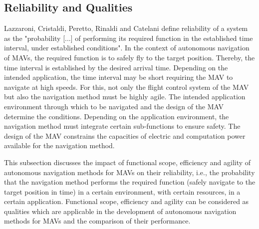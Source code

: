 \subsection{Reliability and Qualities}

Lazzaroni, Cristaldi, Peretto, Rinaldi and Catelani \cite{Lazzaroni2011}
define reliability of a system as the "probability [...] of performing its required function 
in the established time interval, under established conditions".
In the context of autonomous navigation of MAVs,
the required function is to safely fly to the target position.
Thereby, the time interval is established by the desired arrival time.
Depending on the intended application, the time interval may be short requiring the MAV to navigate at high speeds.
For this, not only the flight control system of the MAV but also the navigation method must be highly agile.
The intended application environment through which to be navigated and the design of the MAV determine the conditions.
Depending on the application environment, the navigation method must integrate certain sub-functions to ensure safety.
The design of the MAV constrains the capacities of electric and computation power available for the navigation method.

This subsection discusses the impact of functional scope, efficiency and agility
of autonomous navigation methods for MAVs on their reliability, 
i.e., the probability that the navigation method performs 
the required function (safely navigate to the target position in time)
in a certain environment, with certain resources, in a certain application.
Functional scope, efficiency and agility can be considered as qualities
which are applicable in the development of autonomous navigation methods for MAVs and the comparison of their performance.


